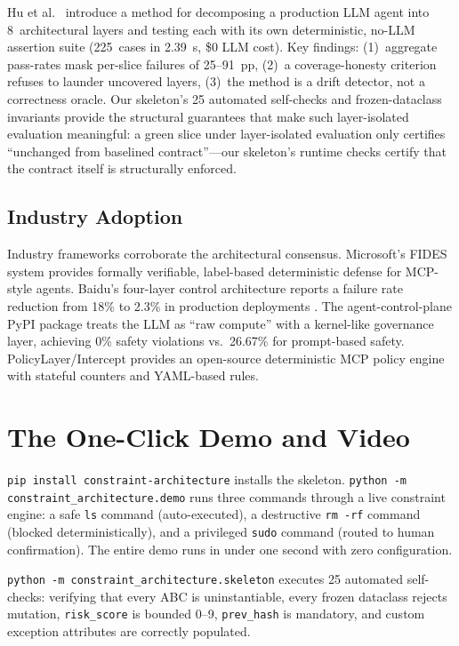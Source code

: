 \documentclass[letterpaper]{article}
\begin{document}
Hu et al.\ \cite{hu2026} introduce a method for decomposing a production
LLM agent into 8~architectural layers and testing each with its own
deterministic, no-LLM assertion suite (225~cases in 2.39~s, \$0 LLM cost).
Key findings: (1)~aggregate pass-rates mask per-slice failures of 25--91~pp,
(2)~a coverage-honesty criterion refuses to launder uncovered layers,
(3)~the method is a drift detector, not a correctness oracle.  Our skeleton's
25 automated self-checks and frozen-dataclass invariants provide the
structural guarantees that make such layer-isolated evaluation meaningful:
a green slice under layer-isolated evaluation only certifies ``unchanged
from baselined contract''---our skeleton's runtime checks certify that the
contract itself is structurally enforced.

\subsection{Industry Adoption}

Industry frameworks corroborate the architectural consensus.  Microsoft's
FIDES system provides formally verifiable, label-based deterministic defense
for MCP-style agents.  Baidu's four-layer control architecture reports a
failure rate reduction from 18\% to 2.3\% in production deployments
\cite{baidu2026fourlayer}.  The agent-control-plane PyPI package treats the
LLM as ``raw compute'' with a kernel-like governance layer, achieving 0\%
safety violations vs.\ 26.67\% for prompt-based safety.  PolicyLayer/Intercept
provides an open-source deterministic MCP policy engine with stateful counters
and YAML-based rules.

\section{The One-Click Demo and Video}

\texttt{pip install constraint-architecture} installs the skeleton.
\texttt{python -m constraint\_architecture.demo} runs three commands through
a live constraint engine: a safe \texttt{ls} command (auto-executed), a
destructive \texttt{rm -rf} command (blocked deterministically), and a
privileged \texttt{sudo} command (routed to human confirmation).  The entire
demo runs in under one second with zero configuration.

\texttt{python -m constraint\_architecture.skeleton} executes 25 automated
self-checks: verifying that every ABC is uninstantiable, every frozen
dataclass rejects mutation, \texttt{risk\_score} is bounded 0--9,
\texttt{prev\_hash} is mandatory, and custom exception attributes are
correctly populated.
\end{document}
